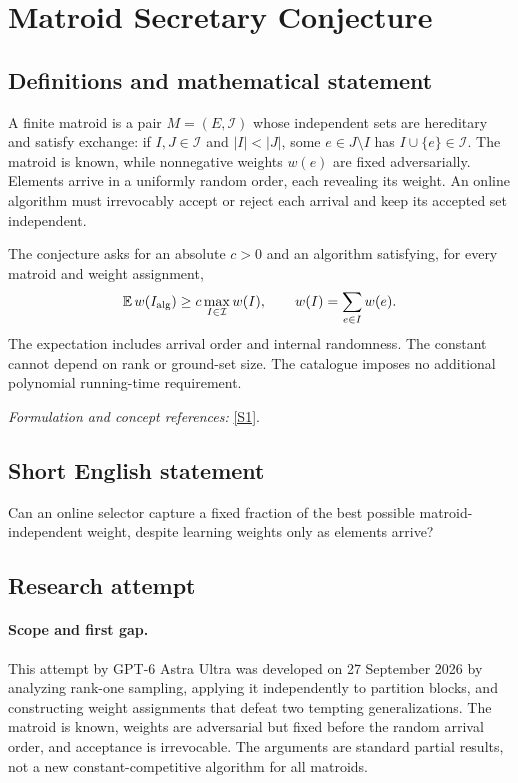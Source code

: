 \documentclass[11pt]{article}
\begin{document}
\section*{\texorpdfstring{Matroid Secretary Conjecture}{Matroid Secretary Conjecture}}\label{432}
\subsection{Definitions and mathematical statement}
A finite matroid is a pair $M=(E,\mathcal I)$ whose independent sets are hereditary and satisfy exchange: if $I,J\in\mathcal I$ and $|I|<|J|$, some $e\in J\setminus I$ has $I\cup\{e\}\in\mathcal I$. The matroid is known, while nonnegative weights $w(e)$ are fixed adversarially. Elements arrive in a uniformly random order, each revealing its weight. An online algorithm must irrevocably accept or reject each arrival and keep its accepted set independent.

The conjecture asks for an absolute $c>0$ and an algorithm satisfying, for every matroid and weight assignment,
\[
 {\mathbb{E}}\,w(I_{\rm alg})\ge c\max_{I\in\mathcal I}w(I),
 \qquad w(I)=\sum_{e\in I}w(e).
\]
The expectation includes arrival order and internal randomness. The constant cannot depend on rank or ground-set size. The catalogue imposes no additional polynomial running-time requirement.
\par\smallskip\textit{Formulation and concept references:} \href{https://drops.dagstuhl.de/storage/00lipics/lipics-vol215-itcs2022/LIPIcs.ITCS.2022.58/LIPIcs.ITCS.2022.58.pdf}{[S1]}.

\subsection{Short English statement}
Can an online selector capture a fixed fraction of the best possible matroid-independent weight, despite learning weights only as elements arrive?
\subsection{Research attempt}
\paragraph{Scope and first gap.}
This attempt by GPT-6 Astra Ultra was developed on 27 September 2026 by analyzing rank-one sampling, applying it independently to partition blocks, and constructing weight assignments that defeat two tempting generalizations. The matroid is known, weights are adversarial but fixed before the random arrival order, and acceptance is irrevocable. The arguments are standard partial results, not a new constant-competitive algorithm for all matroids.
\end{document}
